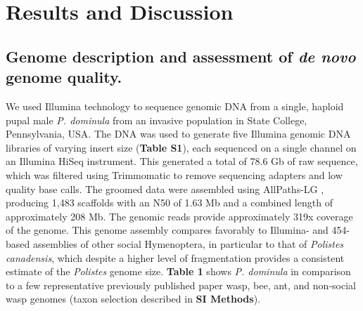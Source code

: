 \section{Results and Discussion}

\subsection{Genome description and assessment of \textit{de novo} genome
quality.} We used Illumina technology to sequence genomic DNA from a
single, haploid pupal male \textit{P. dominula} from an invasive
population in State College, Pennsylvania, USA. The DNA was used to
generate five Illumina genomic DNA libraries of varying insert size
(\textbf{Table S1}), each sequenced on a single channel on an Illumina
HiSeq instrument. This generated a total of 78.6 Gb of raw sequence,
which was filtered using Trimmomatic \cite{Trimmomatic} to
remove sequencing adapters and low quality base calls. The groomed data
were assembled using AllPaths-LG \cite{AllPathsLG},
producing 1,483 scaffolds with an N50 of 1.63 Mb and a combined length
of approximately 208 Mb. The genomic reads provide approximately 319x
coverage of the genome. This genome assembly compares favorably to
Illumina- and 454-based assemblies of other social Hymenoptera, in
particular to that of \textit{Polistes canadensis}, which despite a higher
level of fragmentation provides a consistent estimate of the
\textit{Polistes} genome size. \textbf{Table 1} shows \textit{P. dominula}
in comparison to a few representative previously published paper wasp,
bee, ant, and non-social wasp genomes (taxon selection described in
\textbf{SI Methods}).

